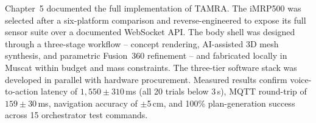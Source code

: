 Chapter~5 documented the full implementation of TAMRA. The iMRP500 was selected after a six-platform comparison and reverse-engineered to expose its full sensor suite over a documented WebSocket API. The body shell was designed through a three-stage workflow -- concept rendering, AI-assisted 3D mesh synthesis, and parametric Fusion~360 refinement -- and fabricated locally in Muscat within budget and mass constraints. The three-tier software stack was developed in parallel with hardware procurement. Measured results confirm voice-to-action latency of $1{,}550 \pm 310$\,ms (all 20 trials below 3\,s), MQTT round-trip of $159 \pm 30$\,ms, navigation accuracy of $\pm$5\,cm, and 100\% plan-generation success across 15 orchestrator test commands.
